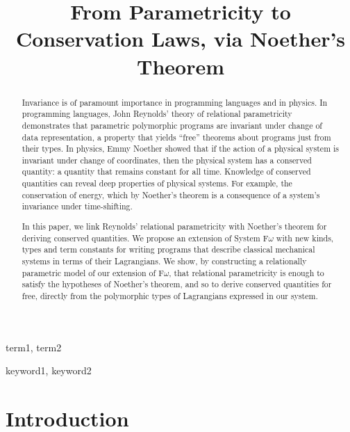\documentclass[preprint]{sigplanconf}
\title{From Parametricity to Conservation Laws, via Noether's Theorem}
\theoremstyle{examplestyle}
\begin{document}
\maketitle

\begin{abstract}
  Invariance is of paramount importance in programming languages and
  in physics. In programming languages, John Reynolds' theory of
  relational parametricity demonstrates that parametric polymorphic
  programs are invariant under change of data representation, a
  property that yields ``free'' theorems about programs just from
  their types. In physics, Emmy Noether showed that if the action of a
  physical system is invariant under change of coordinates, then the
  physical system has a conserved quantity: a quantity that remains
  constant for all time. Knowledge of conserved quantities can reveal
  deep properties of physical systems. For example, the conservation
  of energy, which by Noether's theorem is a consequence of a system's
  invariance under time-shifting.

  In this paper, we link Reynolds' relational parametricity with
  Noether's theorem for deriving conserved quantities. We propose an
  extension of System F$\omega$ with new kinds, types and term
  constants for writing programs that describe classical mechanical
  systems in terms of their Lagrangians. We show, by constructing a
  relationally parametric model of our extension of F$\omega$, that
  relational parametricity is enough to satisfy the hypotheses of
  Noether's theorem, and so to derive conserved quantities for free,
  directly from the polymorphic types of Lagrangians expressed in our
  system.
\end{abstract}


\terms
term1, term2

\keywords
keyword1, keyword2

\section{Introduction}
\end{document}

